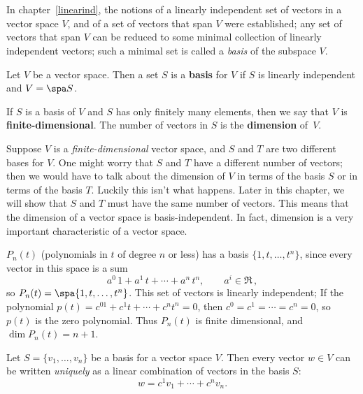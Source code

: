 \chapter{\basisDimTitle}\label{basisdimension}

\label{sec:dimension}
\label{dimension}
In chapter~\ref{linearind}, the notions of   a linearly independent set of vectors in a vector space $V$, and of a set of vectors that span $V$ were established; any set of vectors that span $V$ can be reduced to some minimal collection of linearly independent vectors; such a minimal set is called a \emph{basis} of the subspace $V$.  

\begin{definition}
Let $V$ be a vector space.  Then a set $S$ is a {\bfseries basis} for $V$ if $S$ is linearly independent and $V=\spa S$.


If $S$ is a basis of $V$ and $S$ has only finitely many elements, then we say that $V$ is {\bfseries finite-dimensional}.  The number of vectors in $S$ is the {\bfseries dimension} of~$V$.
\end{definition}

Suppose $V$ is a \emph{finite-dimensional} vector space, and $S$ and $T$ are two different bases for $V$.  One might worry that $S$ and $T$ have a different number of vectors; then we would have to talk about the dimension of $V$ in terms of the basis $S$ or in terms of the basis $T$.  Luckily this isn't what happens.
Later in this chapter, we will show that $S$ and $T$ must have the same number of vectors.  This means that the dimension of a vector space is basis-independent.  In fact, dimension is a very important  characteristic of a vector space.%

\begin{example}
$P_n(t)$ (polynomials in $t$ of degree $n$ or less) has a basis $\{1,t,\ldots , t^n \}$, since every vector in this space is a sum
\[
a^0\,1+a^1\,t+\cdots +a^n\,t^n, \qquad a^i\in \Re\, ,
\]
so $P_n(t)=\spa \{1,t,\ldots , t^n \}$.  This set of vectors is linearly independent;  If the polynomial $p(t)=c^01+c^1t+\cdots +c^nt^n=0$, then $c^0=c^1=\cdots =c^n=0$, so $p(t)$ is the zero polynomial.  
Thus $P_n(t)$ is finite dimensional, and $\dim P_n(t)=n+1$.
\end{example}



\begin{theorem}\label{uniqvec}
Let $S=\{v_1, \ldots, v_n \}$  be a basis for a vector space $V$.  Then every vector $w \in V$ can be written \emph{uniquely} as a linear combination of vectors in the basis $S$:
\[
w=c^1v_1+\cdots + c^nv_n.
\]
\end{theorem}

